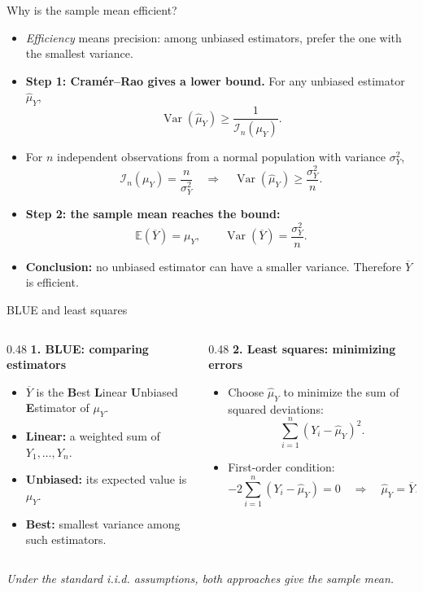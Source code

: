 \documentclass[notes,10pt, aspectratio=169]{beamer}
\begin{document}
\begin{frame}{Why is the sample mean efficient?}
\begin{itemize}
    \item \textit{Efficiency} means precision: among unbiased estimators, prefer the one with the smallest variance.
    \item \textbf{Step 1: Cramér--Rao gives a lower bound.} For any unbiased estimator $\hat{\mu}_Y$,
    \[
        \operatorname{Var}(\hat{\mu}_Y)\geq \frac{1}{\mathcal{I}_n(\mu_Y)}.
    \]
    \item For $n$ independent observations from a normal population with variance $\sigma_Y^2$,
    \[
        \mathcal{I}_n(\mu_Y)=\frac{n}{\sigma_Y^2}
        \quad\Longrightarrow\quad
        \operatorname{Var}(\hat{\mu}_Y)\geq \frac{\sigma_Y^2}{n}.
    \]
    \item \textbf{Step 2: the sample mean reaches the bound:}
    \[
        \mathbb{E}(\overline{Y})=\mu_Y,\qquad
        \operatorname{Var}(\overline{Y})=\frac{\sigma_Y^2}{n}.
    \]
    \item \textbf{Conclusion:} no unbiased estimator can have a smaller variance. Therefore $\overline{Y}$ is efficient.
\end{itemize}
\end{frame}

\begin{frame}{BLUE and least squares}
\begin{columns}[T]
\begin{column}{0.48\textwidth}
    \textbf{1. BLUE: comparing estimators}
    \begin{itemize}
        \item $\overline{Y}$ is the \textbf{B}est \textbf{L}inear \textbf{U}nbiased \textbf{E}stimator of $\mu_Y$.
        \item \textbf{Linear:} a weighted sum of $Y_1,\ldots,Y_n$.
        \item \textbf{Unbiased:} its expected value is $\mu_Y$.
        \item \textbf{Best:} smallest variance among such estimators.
    \end{itemize}
\end{column}
\begin{column}{0.48\textwidth}
    \textbf{2. Least squares: minimizing errors}
    \begin{itemize}
        \item Choose $\hat{\mu}_Y$ to minimize the sum of squared deviations:
        \[
            \sum_{i=1}^n (Y_i-\hat{\mu}_Y)^2.
        \]
        \item First-order condition:
        \[
        -2\sum_{i=1}^n(Y_i-\hat{\mu}_Y)=0
        \quad\Longrightarrow\quad
        \hat{\mu}_Y=\overline{Y}.
        \]
    \end{itemize}
\end{column}
\end{columns}
\vspace{0.15cm}
\begin{center}
    \textit{Under the standard i.i.d. assumptions, both approaches give the sample mean.}
\end{center}
\end{frame}
\end{document}
